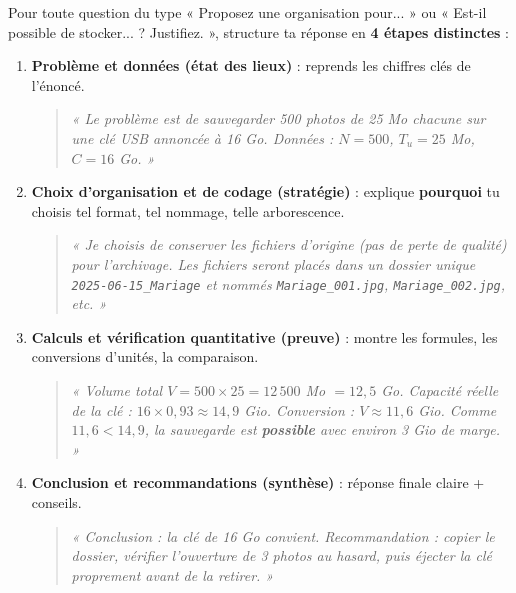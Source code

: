 \documentclass[11pt]{article}
\begin{document}
\begin{methode}
Pour toute question du type « Proposez une organisation pour... » ou « Est-il possible de stocker... ? Justifiez. », structure ta réponse en \textbf{4 étapes distinctes} :

\begin{enumerate}
    \item \textbf{Problème et données (état des lieux)} : reprends les chiffres clés de l'énoncé.
    \begin{quote}
    \textit{« Le problème est de sauvegarder 500 photos de 25 Mo chacune sur une clé USB annoncée à 16 Go. Données : $N=500$, $T_u=25$ Mo, $C=16$ Go. »}
    \end{quote}

    \item \textbf{Choix d'organisation et de codage (stratégie)} : explique \textbf{pourquoi} tu choisis tel format, tel nommage, telle arborescence.
    \begin{quote}
    \textit{« Je choisis de conserver les fichiers d'origine (pas de perte de qualité) pour l'archivage. Les fichiers seront placés dans un dossier unique \texttt{2025-06-15\_Mariage} et nommés \texttt{Mariage\_001.jpg}, \texttt{Mariage\_002.jpg}, etc. »}
    \end{quote}

    \item \textbf{Calculs et vérification quantitative (preuve)} : montre les formules, les conversions d'unités, la comparaison.
    \begin{quote}
    \textit{« Volume total $V = 500 \times 25 = 12\,500$ Mo $= 12,5$ Go. Capacité réelle de la clé : $16 \times 0{,}93 \approx 14,9$ Gio. Conversion : $V \approx 11,6$ Gio. Comme $11,6 < 14,9$, la sauvegarde est \textbf{possible} avec environ 3 Gio de marge. »}
    \end{quote}

    \item \textbf{Conclusion et recommandations (synthèse)} : réponse finale claire + conseils.
    \begin{quote}
    \textit{« Conclusion : la clé de 16 Go convient. Recommandation : copier le dossier, vérifier l'ouverture de 3 photos au hasard, puis éjecter la clé proprement avant de la retirer. »}
    \end{quote}
\end{enumerate}
\end{methode}
\end{document}
